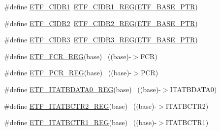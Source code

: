\begin{DoxyCompactItemize}
\item 
\#define \hyperlink{group___e_t_f___register___accessor___macros_gaf4432d41c2c9ae9498d247bbf6c738d2}{E\+T\+F\+\_\+\+C\+I\+D\+R1}~\hyperlink{group___e_t_f___register___accessor___macros_gaf70f578ef4ae9dc6d0d1e27c3b57d0f2}{E\+T\+F\+\_\+\+C\+I\+D\+R1\+\_\+\+R\+EG}(\hyperlink{group___e_t_f___peripheral_ga46da3f879a5311a0651d7908021daa5e}{E\+T\+F\+\_\+\+B\+A\+S\+E\+\_\+\+P\+TR})
\item 
\#define \hyperlink{group___e_t_f___register___accessor___macros_ga0e849979e159aabdbb0331c0679e3c0c}{E\+T\+F\+\_\+\+C\+I\+D\+R2}~\hyperlink{group___e_t_f___register___accessor___macros_gacbbd3a362f90d06779e066903034ea6f}{E\+T\+F\+\_\+\+C\+I\+D\+R2\+\_\+\+R\+EG}(\hyperlink{group___e_t_f___peripheral_ga46da3f879a5311a0651d7908021daa5e}{E\+T\+F\+\_\+\+B\+A\+S\+E\+\_\+\+P\+TR})
\item 
\#define \hyperlink{group___e_t_f___register___accessor___macros_gafb0168c9dc119257f3f16054b469d53d}{E\+T\+F\+\_\+\+C\+I\+D\+R3}~\hyperlink{group___e_t_f___register___accessor___macros_ga30f319179915e151dc415ba158aea9bf}{E\+T\+F\+\_\+\+C\+I\+D\+R3\+\_\+\+R\+EG}(\hyperlink{group___e_t_f___peripheral_ga46da3f879a5311a0651d7908021daa5e}{E\+T\+F\+\_\+\+B\+A\+S\+E\+\_\+\+P\+TR})
\item 
\#define \hyperlink{group___e_t_f___register___accessor___macros_ga3a6090c96a97fedec3eecc70692c9281}{E\+T\+F\+\_\+\+F\+C\+R\+\_\+\+R\+EG}(base)                                            ~((base)-\/$>$F\+CR)
\item 
\#define \hyperlink{group___e_t_f___register___accessor___macros_ga7f09a0cf0ce3ad36eaebb2ece85082bb}{E\+T\+F\+\_\+\+P\+C\+R\+\_\+\+R\+EG}(base)                                            ~((base)-\/$>$P\+CR)
\item 
\#define \hyperlink{group___e_t_f___register___accessor___macros_ga86a704f3527d5df411f99ec8f9676d3d}{E\+T\+F\+\_\+\+I\+T\+A\+T\+B\+D\+A\+T\+A0\+\_\+\+R\+EG}(base)                              ~((base)-\/$>$I\+T\+A\+T\+B\+D\+A\+T\+A0)
\item 
\#define \hyperlink{group___e_t_f___register___accessor___macros_gaa9b800e446803bbceb31252ffb731292}{E\+T\+F\+\_\+\+I\+T\+A\+T\+B\+C\+T\+R2\+\_\+\+R\+EG}(base)                                ~((base)-\/$>$I\+T\+A\+T\+B\+C\+T\+R2)
\item 
\#define \hyperlink{group___e_t_f___register___accessor___macros_ga44f6405ca9c25db97a240bd1aed17297}{E\+T\+F\+\_\+\+I\+T\+A\+T\+B\+C\+T\+R1\+\_\+\+R\+EG}(base)                                ~((base)-\/$>$I\+T\+A\+T\+B\+C\+T\+R1)

\end{DoxyCompactItemize}
